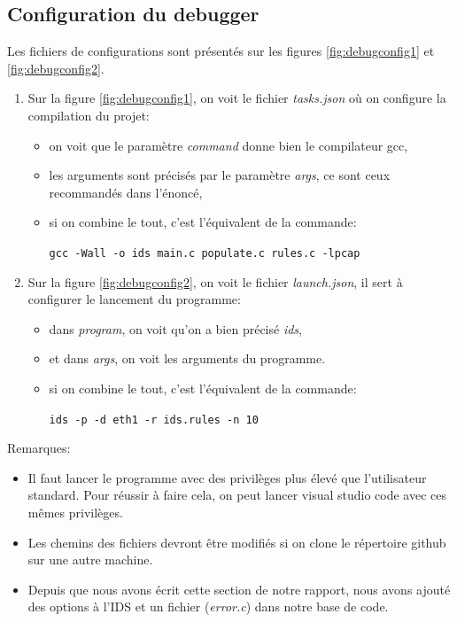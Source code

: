 \documentclass[a4paper]{article}
\begin{document}
\subsection{Configuration du debugger}



Les fichiers de configurations sont présentés sur les figures \ref{fig:debugconfig1} et \ref{fig:debugconfig2}.
\begin{enumerate}
    \item Sur la figure \ref{fig:debugconfig1}, on voit le fichier \textit{tasks.json} où on configure la compilation du projet:
    \begin{itemize}
        \item on voit que le paramètre \textit{command} donne bien le compilateur gcc,
        \item les arguments sont précisés par le paramètre \textit{args}, ce sont ceux recommandés dans l'énoncé,
        \item si on combine le tout, c'est l'équivalent de la commande:
        \begin{center}
            \texttt{\small gcc -Wall -o ids main.c populate.c rules.c -lpcap}
        \end{center}
    \end{itemize}
    \item Sur la figure \ref{fig:debugconfig2}, on voit le fichier \textit{launch.json}, il sert à configurer le lancement du programme:
    \begin{itemize}
        \item dans \textit{program}, on voit qu'on a bien précisé \textit{ids},
        \item et dans \textit{args}, on voit les arguments du programme.
        \item si on combine le tout, c'est l'équivalent de la commande:
        \begin{center}
            \texttt{\small ids -p -d eth1 -r ids.rules -n 10}
        \end{center}
    \end{itemize}
\end{enumerate}
Remarques:
\begin{itemize}
    \item Il faut lancer le programme avec des privilèges plus élevé que l'utilisateur standard. Pour réussir à faire cela, on peut lancer visual studio code avec ces mêmes privilèges.
    \item Les chemins des fichiers devront être modifiés si on clone le répertoire github sur une autre machine.
    \item Depuis que nous avons écrit cette section de notre rapport, nous avons ajouté des options à l'IDS et un fichier (\textit{error.c}) dans notre base de code.
\end{itemize}
\end{document}
